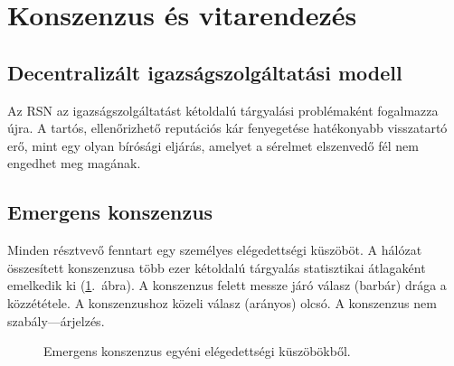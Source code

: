 \documentclass[11pt,a4paper,twocolumn]{article}
\begin{document}
\section{Konszenzus és vitarendezés}

\subsection{Decentralizált igazságszolgáltatási modell}

Az RSN az igazságszolgáltatást kétoldalú tárgyalási problémaként fogalmazza újra. A tartós, ellenőrizhető reputációs kár fenyegetése hatékonyabb visszatartó erő, mint egy olyan bírósági eljárás, amelyet a sérelmet elszenvedő fél nem engedhet meg magának.

\subsection{Emergens konszenzus}

Minden résztvevő fenntart egy személyes elégedettségi küszöböt. A hálózat összesített konszenzusa több ezer kétoldalú tárgyalás statisztikai átlagaként emelkedik ki (\ref{fig:consensus}.~ábra). A konszenzus felett messze járó válasz (barbár) drága a közzététele. A konszenzushoz közeli válasz (arányos) olcsó. A konszenzus nem szabály---árjelzés.

\begin{figure}[ht]
\centering
{}
\caption{Emergens konszenzus egyéni elégedettségi küszöbökből.}
\label{fig:consensus}
\end{figure}
\end{document}
